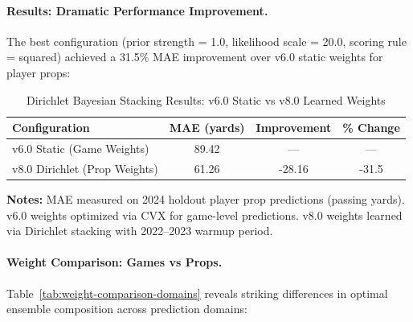 \paragraph{Results: Dramatic Performance Improvement.}
The best configuration (prior strength = 1.0, likelihood scale = 20.0, scoring rule = squared) achieved a 31.5\% MAE improvement over v6.0 static weights for player props:

\begin{table}[htbp]
\centering
\caption{Dirichlet Bayesian Stacking Results: v6.0 Static vs v8.0 Learned Weights}
\label{tab:dirichlet-results}
\small
\begin{tabular}{@{} l S[table-format=2.2] S[table-format=2.2] S[table-format=+2.1] @{}}
\toprule
\textbf{Configuration} & {\textbf{MAE (yards)}} & {\textbf{Improvement}} & {\textbf{\% Change}} \\
\midrule
v6.0 Static (Game Weights) & 89.42 & {---} & {---} \\
v8.0 Dirichlet (Prop Weights) & 61.26 & -28.16 & -31.5 \\
\bottomrule
\end{tabular}
\begin{tablenotes}
\item \textbf{Notes:} MAE measured on 2024 holdout player prop predictions (passing yards). v6.0 weights optimized via CVX for game-level predictions. v8.0 weights learned via Dirichlet stacking with 2022--2023 warmup period.
\end{tablenotes}
\end{table}

\paragraph{Weight Comparison: Games vs Props.}
Table~\ref{tab:weight-comparison-domains} reveals striking differences in optimal ensemble composition across prediction domains:


